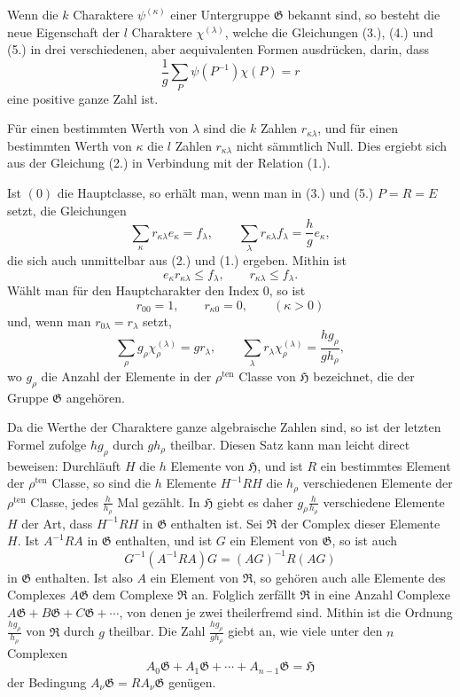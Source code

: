 \documentclass[11pt]{article}
\newcommand{\Hgr}{\mathfrak{H}}
\newcommand{\Ggr}{\mathfrak{G}}
\begin{document}
Wenn die $k$ Charaktere $\psi^{(\kappa)}$ einer Untergruppe $\Ggr$ bekannt sind, so besteht die neue Eigenschaft der $l$ Charaktere $\chi^{(\lambda)}$, welche die Gleichungen (3.), (4.) und (5.) in drei verschiedenen, aber aequivalenten Formen ausdrücken, darin, dass
\[
\tag{4a.}
  \frac{1}{g}\sum_P \psi(P^{-1})\chi(P)=r
\]
eine positive ganze Zahl ist.

Für einen bestimmten Werth von $\lambda$ sind die $k$ Zahlen $r_{\kappa\lambda}$, und für einen bestimmten Werth von $\kappa$ die $l$ Zahlen $r_{\kappa\lambda}$ nicht sämmtlich Null. Dies ergiebt sich aus der Gleichung (2.) in Verbindung mit der Relation (1.).

Ist $(0)$ die Hauptclasse, so erhält man, wenn man in (3.) und (5.) $P=R=E$ setzt, die Gleichungen
\[
\tag{6.}
  \sum_\kappa r_{\kappa\lambda}e_\kappa=f_\lambda,
  \qquad
  \sum_\lambda r_{\kappa\lambda}f_\lambda=\frac{h}{g}e_\kappa,
\]
die sich auch unmittelbar aus (2.) und (1.) ergeben. Mithin ist
\[
\tag{7.}
  e_\kappa r_{\kappa\lambda}\le f_\lambda,
  \qquad
  r_{\kappa\lambda}\le f_\lambda.
\]
Wählt man für den Hauptcharakter den Index $0$, so ist
\[
\tag{8.}
  r_{00}=1,\qquad r_{\kappa 0}=0,\qquad(\kappa>0)
\]
und, wenn man $r_{0\lambda}=r_\lambda$ setzt,
\[
\tag{9.}
  \sum_\rho g_\rho\chi_\rho^{(\lambda)}=g r_\lambda,
  \qquad
  \sum_\lambda r_\lambda\chi_\rho^{(\lambda)}
  =
  \frac{h g_\rho}{g h_\rho},
\]
wo $g_\rho$ die Anzahl der Elemente in der $\rho^{\mathrm{ten}}$ Classe von $\Hgr$ bezeichnet, die der Gruppe $\Ggr$ angehören.

Da die Werthe der Charaktere ganze algebraische Zahlen sind, so ist der letzten Formel zufolge $h g_\rho$ durch $g h_\rho$ theilbar. Diesen Satz kann man leicht direct beweisen: Durchläuft $H$ die $h$ Elemente von $\Hgr$, und ist $R$ ein bestimmtes Element der $\rho^{\mathrm{ten}}$ Classe, so sind die $h$ Elemente $H^{-1}RH$ die $h_\rho$ verschiedenen Elemente der $\rho^{\mathrm{ten}}$ Classe, jedes $\frac{h}{h_\rho}$ Mal gezählt. In $\Hgr$ giebt es daher $g_\rho\frac{h}{h_\rho}$ verschiedene Elemente $H$ der Art, dass $H^{-1}RH$ in $\Ggr$ enthalten ist. Sei $\mathfrak R$ der Complex dieser Elemente $H$. Ist $A^{-1}RA$ in $\Ggr$ enthalten, und ist $G$ ein Element von $\Ggr$, so ist auch
\[
  G^{-1}(A^{-1}RA)G=(AG)^{-1}R(AG)
\]
in $\Ggr$ enthalten. Ist also $A$ ein Element von $\mathfrak R$, so gehören auch alle Elemente des Complexes $A\Ggr$ dem Complexe $\mathfrak R$ an. Folglich zerfällt $\mathfrak R$ in eine Anzahl Complexe $A\Ggr+B\Ggr+C\Ggr+\cdots$, von denen je zwei theilerfremd sind. Mithin ist die Ordnung $\frac{h g_\rho}{h_\rho}$ von $\mathfrak R$ durch $g$ theilbar. Die Zahl $\frac{h g_\rho}{g h_\rho}$ giebt an, wie viele unter den $n$ Complexen
\[
\tag{10.}
  A_0\Ggr+A_1\Ggr+\cdots+A_{n-1}\Ggr=\Hgr
\]
der Bedingung $A_\nu\Ggr=R A_\nu\Ggr$ genügen.
\end{document}
